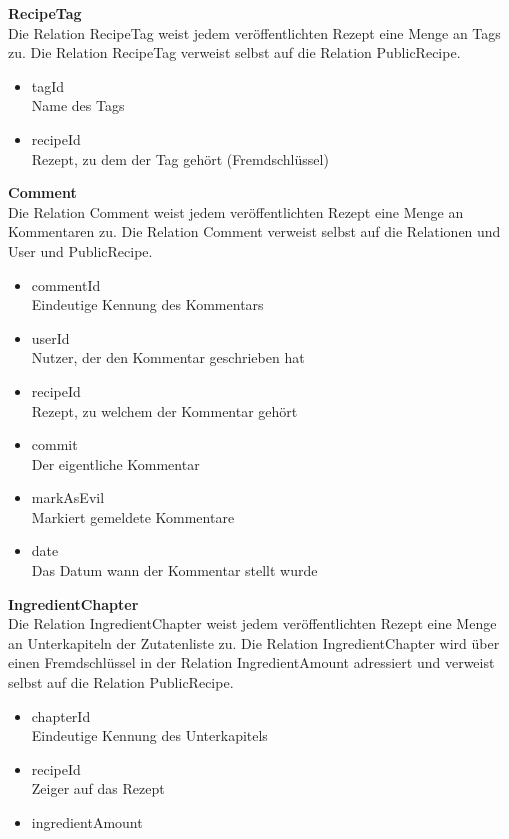 \textbf{RecipeTag}\\
Die Relation RecipeTag weist jedem veröffentlichten Rezept eine Menge an Tags zu. Die Relation RecipeTag verweist selbst auf die Relation PublicRecipe.

\begin{itemize}
	\item tagId \\ Name des Tags %
	\item recipeId \\ Rezept, zu dem der Tag gehört (Fremdschlüssel)
\end{itemize}

\textbf{Comment}\\
Die Relation Comment weist jedem veröffentlichten Rezept eine Menge an Kommentaren zu. Die Relation Comment verweist selbst auf die Relationen und User und PublicRecipe.

\begin{itemize}
	\item commentId \\ Eindeutige Kennung des Kommentars
	\item userId \\ Nutzer, der den Kommentar geschrieben hat
	\item recipeId \\ Rezept, zu welchem der Kommentar gehört
	\item commit \\ Der eigentliche Kommentar
	\item markAsEvil \\ Markiert gemeldete Kommentare
	\item date \\Das Datum wann der Kommentar stellt wurde
\end{itemize}

\textbf{IngredientChapter}\\
Die Relation IngredientChapter weist jedem veröffentlichten Rezept eine Menge an Unterkapiteln der Zutatenliste zu. Die Relation IngredientChapter wird über einen Fremdschlüssel in der Relation IngredientAmount adressiert und verweist selbst auf die Relation PublicRecipe.

\begin{itemize}
	\item chapterId \\ Eindeutige Kennung des Unterkapitels
	\item recipeId \\ Zeiger auf das Rezept
	\item ingredientAmount 
\end{itemize}

